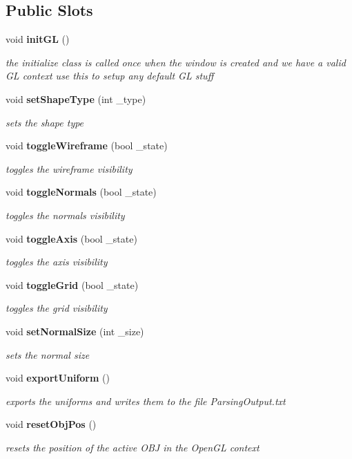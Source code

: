 \subsection*{Public Slots}
\begin{DoxyCompactItemize}
\item 
void {\bf init\-G\-L} ()
\begin{DoxyCompactList}\small\item\em the initialize class is called once when the window is created and we have a valid G\-L context use this to setup any default G\-L stuff \end{DoxyCompactList}\item 
void {\bf set\-Shape\-Type} (int \-\_\-type)
\begin{DoxyCompactList}\small\item\em sets the shape type \end{DoxyCompactList}\item 
void {\bf toggle\-Wireframe} (bool \-\_\-state)
\begin{DoxyCompactList}\small\item\em toggles the wireframe visibility \end{DoxyCompactList}\item 
void {\bf toggle\-Normals} (bool \-\_\-state)
\begin{DoxyCompactList}\small\item\em toggles the normals visibility \end{DoxyCompactList}\item 
void {\bf toggle\-Axis} (bool \-\_\-state)
\begin{DoxyCompactList}\small\item\em toggles the axis visibility \end{DoxyCompactList}\item 
void {\bf toggle\-Grid} (bool \-\_\-state)
\begin{DoxyCompactList}\small\item\em toggles the grid visibility \end{DoxyCompactList}\item 
void {\bf set\-Normal\-Size} (int \-\_\-size)
\begin{DoxyCompactList}\small\item\em sets the normal size \end{DoxyCompactList}\item 
void {\bf export\-Uniform} ()
\begin{DoxyCompactList}\small\item\em exports the uniforms and writes them to the file Parsing\-Output.\-txt \end{DoxyCompactList}\item 
void {\bf reset\-Obj\-Pos} ()
\begin{DoxyCompactList}\small\item\em resets the position of the active O\-B\-J in the Open\-G\-L context \end{DoxyCompactList}\end{DoxyCompactItemize}
